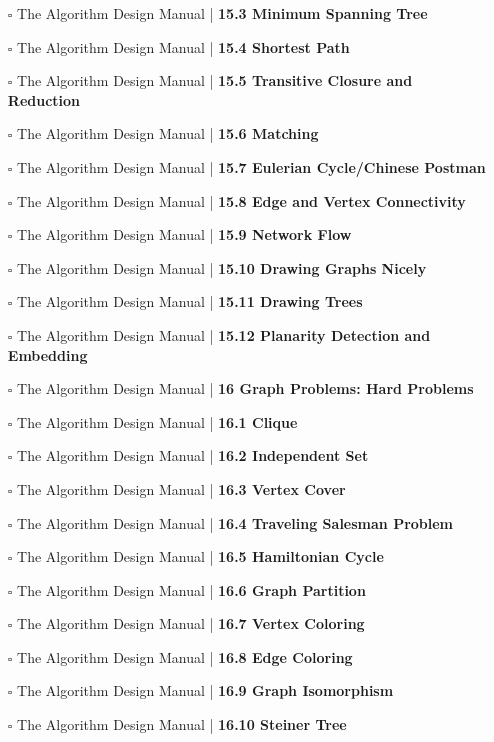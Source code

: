 \documentclass[a4, landscape, 12pt]{article}
\newcommand{\checkbox}{$\square$}%
\begin{document}
\begin{itemize}
{}
\item [\checkbox]  The Algorithm Design Manual | \textbf{ 15.3 Minimum Spanning Tree
}
\item [\checkbox]  The Algorithm Design Manual | \textbf{ 15.4 Shortest Path
}
\item [\checkbox]  The Algorithm Design Manual | \textbf{ 15.5 Transitive Closure and Reduction
}
\item [\checkbox]  The Algorithm Design Manual | \textbf{ 15.6 Matching
}
\item [\checkbox]  The Algorithm Design Manual | \textbf{ 15.7 Eulerian Cycle/Chinese Postman
}
\item [\checkbox]  The Algorithm Design Manual | \textbf{ 15.8 Edge and Vertex Connectivity
}
\item [\checkbox]  The Algorithm Design Manual | \textbf{ 15.9 Network Flow
}
\item [\checkbox]  The Algorithm Design Manual | \textbf{ 15.10 Drawing Graphs Nicely
}
\item [\checkbox]  The Algorithm Design Manual | \textbf{ 15.11 Drawing Trees
}
\item [\checkbox]  The Algorithm Design Manual | \textbf{ 15.12 Planarity Detection and Embedding
}
\item [\checkbox]  The Algorithm Design Manual | \textbf{ 16 Graph Problems: Hard Problems
}
\item [\checkbox]  The Algorithm Design Manual | \textbf{ 16.1 Clique
}
\item [\checkbox]  The Algorithm Design Manual | \textbf{ 16.2 Independent Set
}
\item [\checkbox]  The Algorithm Design Manual | \textbf{ 16.3 Vertex Cover
}
\item [\checkbox]  The Algorithm Design Manual | \textbf{ 16.4 Traveling Salesman Problem
}
\item [\checkbox]  The Algorithm Design Manual | \textbf{ 16.5 Hamiltonian Cycle
}
\item [\checkbox]  The Algorithm Design Manual | \textbf{ 16.6 Graph Partition
}
\item [\checkbox]  The Algorithm Design Manual | \textbf{ 16.7 Vertex Coloring
}
\item [\checkbox]  The Algorithm Design Manual | \textbf{ 16.8 Edge Coloring
}
\item [\checkbox]  The Algorithm Design Manual | \textbf{ 16.9 Graph Isomorphism
}
\item [\checkbox]  The Algorithm Design Manual | \textbf{ 16.10 Steiner Tree
}
\end{itemize}
\end{document}
